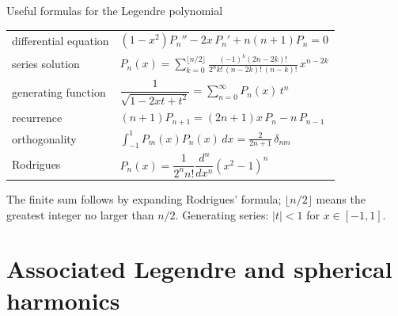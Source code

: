 \documentclass[11pt]{beamer}
\begin{document}
\begin{frame}{Useful formulas for the Legendre polynomial}
\footnotesize
\begin{center}
\renewcommand{\arraystretch}{1.55}
\begin{tabular}{ll}
differential equation
  & $(1-x^2)P_n'' - 2x\,P_n' + n(n+1)P_n = 0$ \\
series solution
  & $P_n(x)=\displaystyle\sum_{k=0}^{\lfloor n/2\rfloor}
       \frac{(-1)^k(2n-2k)!}{2^n k!\,(n-2k)!\,(n-k)!}\,x^{n-2k}$ \\
generating function
  & $\dfrac{1}{\sqrt{1-2xt+t^2}} = \displaystyle\sum_{n=0}^{\infty}P_n(x)\,t^n$ \\
recurrence
  & $(n+1)P_{n+1} = (2n+1)x\,P_n - n\,P_{n-1}$ \\
orthogonality
  & $\displaystyle\int_{-1}^{1}P_m(x)P_n(x)\,dx
       = \frac{2}{2n+1}\,\delta_{nm}$ \\
Rodrigues
  & $P_n(x)=\dfrac{1}{2^n n!}\dfrac{d^n}{dx^n}(x^2-1)^n$
\end{tabular}
\end{center}
\vspace{0.2em}
{\scriptsize The finite sum follows by expanding Rodrigues' formula;
$\lfloor n/2\rfloor$ means the greatest integer no larger than $n/2$.
Generating series: $|t|<1$ for $x\in[-1,1]$.}
\end{frame}

\section{Associated Legendre and spherical harmonics}
\end{document}
